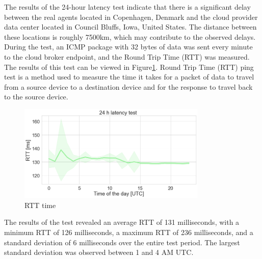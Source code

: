 The results of the 24-hour latency test indicate that there is a significant delay between the real agents located in Copenhagen, Denmark and the cloud provider data center located in Council Bluffs, Iowa, United States. The distance between these locations is roughly 7500km, which may contribute to the observed delays. During the test, an ICMP package with 32 bytes of data was sent every minute to the cloud broker endpoint, and the Round Trip Time (RTT) was measured. The results of this test can be viewed in Figure\ref{fig:ping}. Round Trip Time (RTT) ping test is a method used to measure the time it takes for a packet of data to travel from a source device to a destination device and for the response to travel back to the source device.

\begin{figure}[H]
    \centering
    \includegraphics[width=0.8\textwidth]{pictures/ping.png}
    \caption{ RTT time }
    \label{fig:ping}
\end{figure}

The results of the test revealed an average RTT of 131 milliseconds, with a minimum RTT of 126 milliseconds, a maximum RTT of 236 milliseconds, and a standard deviation of 6 milliseconds over the entire test period. The largest standard deviation was observed between 1 and 4 AM UTC.